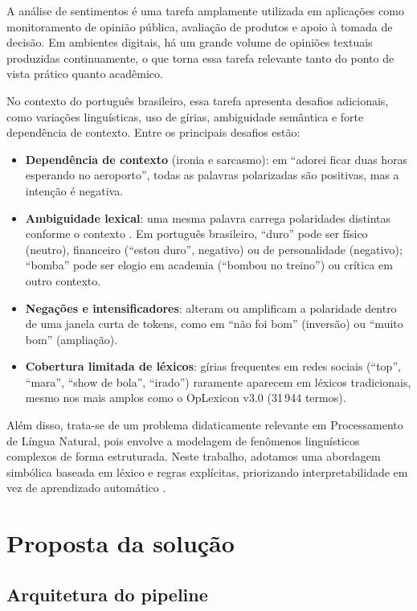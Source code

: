 \documentclass[11pt,a4paper]{article}
\begin{document}
A análise de sentimentos é uma tarefa amplamente utilizada em aplicações como monitoramento de opinião pública, avaliação de produtos e apoio à tomada de decisão. Em ambientes digitais, há um grande volume de opiniões textuais produzidas continuamente, o que torna essa tarefa relevante tanto do ponto de vista prático quanto acadêmico.

No contexto do português brasileiro, essa tarefa apresenta desafios adicionais, como variações linguísticas, uso de gírias, ambiguidade semântica e forte dependência de contexto. Entre os principais desafios estão:

\begin{itemize}
  \item \textbf{Dependência de contexto} (ironia e sarcasmo): em ``adorei ficar duas horas esperando no aeroporto'', todas as palavras polarizadas são positivas, mas a intenção é negativa.
  \item \textbf{Ambiguidade lexical}: uma mesma palavra carrega polaridades distintas conforme o contexto \citep{navigli2009wsd}. Em português brasileiro, ``duro'' pode ser físico (neutro), financeiro (``estou duro'', negativo) ou de personalidade (negativo); ``bomba'' pode ser elogio em academia (``bombou no treino'') ou crítica em outro contexto.
  \item \textbf{Negações e intensificadores}: alteram ou amplificam a polaridade dentro de uma janela curta de tokens, como em ``não foi bom'' (inversão) ou ``muito bom'' (ampliação).
  \item \textbf{Cobertura limitada de léxicos}: gírias frequentes em redes sociais (``top'', ``mara'', ``show de bola'', ``irado'') raramente aparecem em léxicos tradicionais, mesmo nos mais amplos como o OpLexicon v3.0 (31\,944 termos).
\end{itemize}

Além disso, trata-se de um problema didaticamente relevante em Processamento de Língua Natural, pois envolve a modelagem de fenômenos linguísticos complexos de forma estruturada. Neste trabalho, adotamos uma abordagem simbólica baseada em léxico e regras explícitas, priorizando interpretabilidade em vez de aprendizado automático \citep{taboada2011lexicon,hutto2014vader,souza2012sentiment}.

\section{Proposta da solução}

\subsection{Arquitetura do pipeline}
\end{document}
